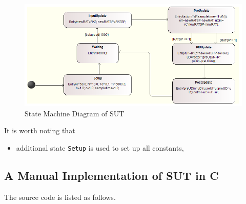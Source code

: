 \begin{figure}[htb!]
    \centering
    \includegraphics[width=1.0\textwidth]{fcu_sut_sm}
    \caption{State Machine Diagram of SUT}
    \label{fig:fcu-sut-sm}
\end{figure}

It is worth noting that
\begin{itemize}
    \item additional state \verb+Setup+ is used to set up all constants,
\end{itemize}

\subsection{A Manual Implementation of SUT in C}

The source code is listed as follows.


